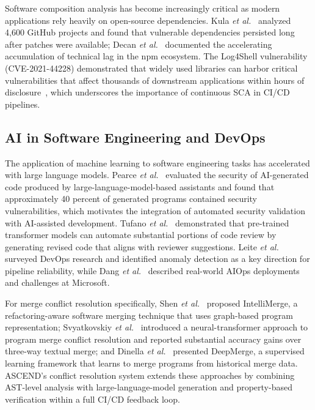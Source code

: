 \documentclass{ieeeaccess}
\begin{document}
Software composition analysis has become increasingly critical as modern applications rely heavily on open-source dependencies. Kula \emph{et al.}~\cite{kula2018developers} analyzed 4{,}600 GitHub projects and found that vulnerable dependencies persisted long after patches were available; Decan \emph{et al.}~\cite{decan2018evolution} documented the accelerating accumulation of technical lag in the npm ecosystem. The Log4Shell vulnerability (CVE-2021-44228) demonstrated that widely used libraries can harbor critical vulnerabilities that affect thousands of downstream applications within hours of disclosure~\cite{everson2022log4shell}, which underscores the importance of continuous SCA in CI/CD pipelines.

\subsection{AI in Software Engineering and DevOps}
The application of machine learning to software engineering tasks has accelerated with large language models. Pearce \emph{et al.}~\cite{pearce2022asleep} evaluated the security of AI-generated code produced by large-language-model-based assistants and found that approximately 40 percent of generated programs contained security vulnerabilities, which motivates the integration of automated security validation with AI-assisted development. Tufano \emph{et al.}~\cite{tufano2022using} demonstrated that pre-trained transformer models can automate substantial portions of code review by generating revised code that aligns with reviewer suggestions. Leite \emph{et al.}~\cite{leite2020survey} surveyed DevOps research and identified anomaly detection as a key direction for pipeline reliability, while Dang \emph{et al.}~\cite{dang2019aiops} described real-world AIOps deployments and challenges at Microsoft.

For merge conflict resolution specifically, Shen \emph{et al.}~\cite{shen2019intellimerge} proposed IntelliMerge, a refactoring-aware software merging technique that uses graph-based program representation; Svyatkovskiy \emph{et al.}~\cite{svyatkovskiy2022program} introduced a neural-transformer approach to program merge conflict resolution and reported substantial accuracy gains over three-way textual merge; and Dinella \emph{et al.}~\cite{dinella2023deepmerge} presented DeepMerge, a supervised learning framework that learns to merge programs from historical merge data. ASCEND's conflict resolution system extends these approaches by combining AST-level analysis with large-language-model generation and property-based verification within a full CI/CD feedback loop.
\end{document}
